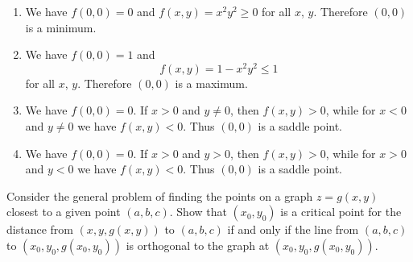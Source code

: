 \begin{solution}
\begin{enumerate}
\item
We have $f(0,0) = 0$ and $f(x,y) = x^2y^2 \geq 0$ for all $x$, $y$. Therefore $(0,0)$ is a minimum.
\item
We have $f(0,0) = 1$ and 
\[
f(x,y) = 1 - x^2y^2 \leq 1
\]
for all $x$, $y$. Therefore $(0,0)$ is a maximum.
\item
We have $f(0,0) = 0$. If $x > 0$ and $y \neq 0$, then $f(x,y) > 0$, while for $x < 0$ and $y \neq 0$ we have $f(x,y) < 0$. Thus $(0,0)$ is a saddle point.
\item
We have $f(0,0) = 0$. If $x > 0$ and $y > 0$, then $f(x,y) > 0$, while for $x > 0$ and $y < 0$ we have $f(x,y) < 0$. Thus $(0,0)$ is a saddle point.
\end{enumerate}
\end{solution}


\begin{question}
Consider the general problem of finding the points on a graph $z = g(x,y)$ closest to a given point $(a,b,c)$. Show that $(x_0, y_0)$ is a critical point for the distance from $(x,y,g(x,y))$ to $(a,b,c)$ if and only if the line from $(a,b,c)$ to $(x_0,y_0,g(x_0,y_0))$ is orthogonal to the graph at $(x_0,y_0,g(x_0,y_0))$.
\end{question}

